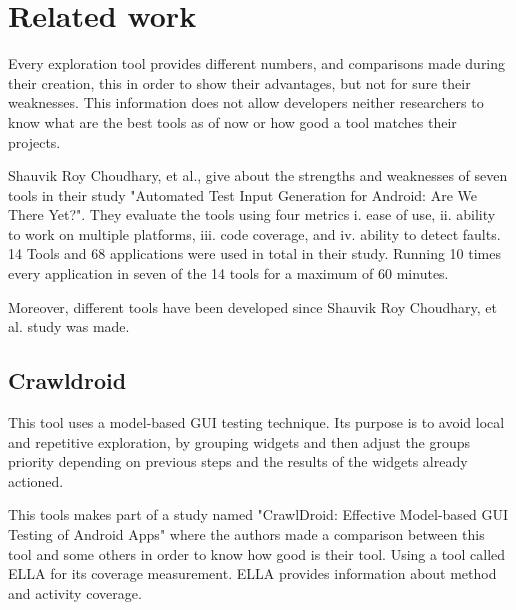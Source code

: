 
\chapter{Related work} %


\label{Chapter2} %


Every exploration tool provides different numbers, and comparisons made during their creation, this in order to show their advantages, but not for sure their weaknesses. This information does not allow developers neither researchers to know what are the best tools as of now or how good a tool matches their projects. 

Shauvik Roy Choudhary, et al., \MARIO{[CITE]} give about the strengths and weaknesses of seven tools in their study "Automated Test Input Generation for Android: Are We There Yet?". They evaluate the tools using four metrics i. ease
of use, ii. ability to work on multiple platforms, iii. code coverage, and iv.
ability to detect faults. 14 Tools and 68 applications were used in total in their study. Running 10 times every application in seven of the 14 tools for a maximum of 60 minutes.

Moreover, different tools have been developed since Shauvik Roy Choudhary, et al. \MARIO{[CITE]} study was made. 

\section{Crawldroid}

This tool uses a model-based GUI testing technique. Its purpose is to avoid local and repetitive exploration, by grouping widgets and then adjust the groups priority depending on previous steps and the results of the widgets already actioned. 

This tools makes part of a study named "CrawlDroid: Effective Model-based GUI Testing of Android Apps" where the authors made a comparison between this tool and some others in order to know how good is their tool. Using a tool called ELLA for its coverage measurement. ELLA provides information about method and activity coverage. 

